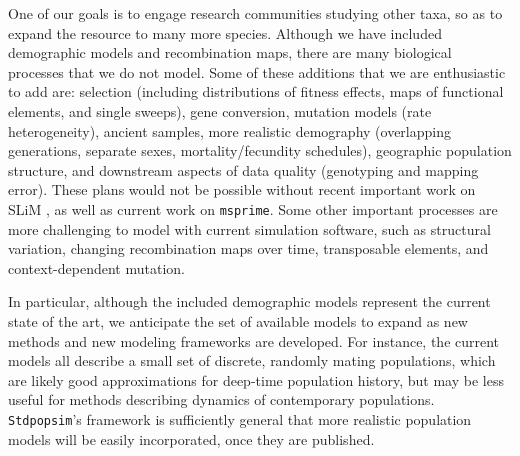 \documentclass[12pt,halfline,a4paper]{ouparticle}
\newcommand{\Stdpopsim}{\texttt{Stdpopsim}\xspace}
\begin{document}
One of our goals is to engage research communities studying other taxa,
so as to expand the resource to many more species.
Although we have included demographic models and recombination maps,
there are many biological processes that we do not model.
Some of these additions that we are enthusiastic to add are:
selection (including distributions of fitness effects, maps of functional elements, and single sweeps),
gene conversion, mutation models (rate heterogeneity),
ancient samples,
more realistic demography (overlapping generations, separate sexes, mortality/fecundity schedules),
geographic population structure,
and downstream aspects of data quality (genotyping and mapping error).
These plans would not be possible without recent important work on SLiM \citep{haller2019slim},
as well as current work on \texttt{msprime}.
Some other important processes are more challenging to model with current simulation software,
such as
structural variation,
changing recombination maps over time,
transposable elements,
and context-dependent mutation.

In particular, although the included demographic models represent the current state of the art,
we anticipate the set of available models to expand
as new methods and new modeling frameworks are developed.
For instance, the current models all describe a small set of discrete, randomly mating populations,
which are likely good approximations for deep-time population history,
but may be less useful for methods describing dynamics of contemporary populations.
\Stdpopsim's framework is sufficiently general that more realistic population models
will be easily incorporated, once they are published.
\end{document}
